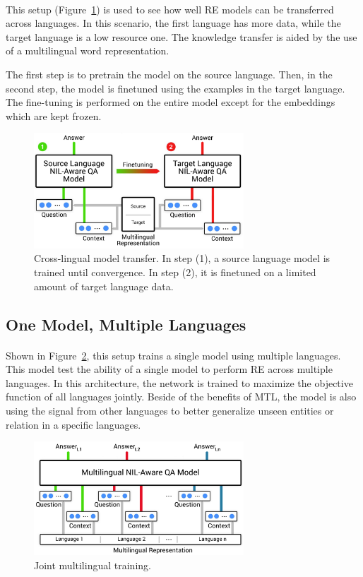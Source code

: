 \paragraph{}
This setup (Figure~\ref{fig:setupTransfer}) is used to see how well RE models can be transferred across languages. In this scenario, the first language has more data, while the target language is a low resource one. The knowledge transfer is aided by the use of a multilingual word representation.

The first step is to pretrain the model on the source language. Then, in the second step, the model is finetuned using the examples in the target language. The fine-tuning is performed on the entire model except for the embeddings which are kept frozen.

\begin{figure}[h]
    \centering
    \includegraphics[width=0.7\textwidth]{images/model_v2.pdf}
    \caption{Cross-lingual model transfer. In step (1), a source language model is trained until convergence. In step (2), it is finetuned on a limited amount of target language data.}
    \label{fig:setupTransfer}
\end{figure}%

\subsection{One Model, Multiple Languages}
\label{sec:onemodel}
\paragraph{}
Shown in Figure~\ref{fig:setupMulti}, this setup trains a single model using multiple languages. This model test the ability of a single model to perform RE across multiple languages. In this architecture, the network is trained to maximize the objective function of all languages jointly. Beside of the benefits of MTL, the model is also using the signal from other languages to better generalize unseen entities or relation in a specific languages.



\begin{figure}[h]
    \centering
     \includegraphics[width=0.7\textwidth]{images/model_joint_unique.pdf}
    \caption{Joint multilingual training.}
    \label{fig:setupMulti}
\end{figure}